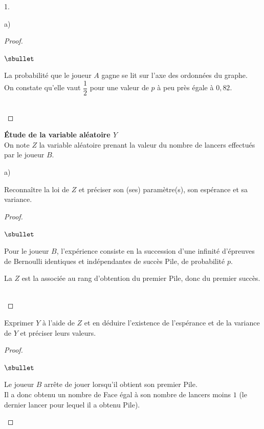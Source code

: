 \begin{noliste}{1.}
\begin{noliste}{a)}
\begin{proof}
\begin{noliste}{$\sbullet$}
      \item La probabilité que le joueur $A$ gagne se lit sur l'axe 
      des ordonnées du graphe.\\
      On constate qu'elle vaut $\dfrac{1}{2}$ pour une valeur de $p$
      à peu près égale à $0,82$.
     \end{noliste}
     ~\\[-1cm]
    \end{proof}
  \end{noliste}
  
  \item {\bf Étude de la variable aléatoire $Y$}\\[.1cm]
  On note $Z$ la variable aléatoire prenant la valeur du nombre de 
  lancers effectués par le joueur $B$.
  \begin{noliste}{a)}
    \setlength{\itemsep}{2mm}
    \item Reconnaître la loi de $Z$ et préciser son (ses) paramètre(s), 
    son espérance et sa variance.
    
    \begin{proof}~
      \begin{noliste}{$\sbullet$}
	\item Pour le joueur $B$, l'expérience consiste en la 
	succession d'une infinité d'épreuves de Bernoulli 
	identiques et indépendantes de succès Pile, de probabilité $p$.
	
	\item La \var $Z$ est la \var associée au rang d'obtention 
	du premier Pile, donc du premier succès.
      \end{noliste}
      ~\\[-1cm]
    \end{proof}

    
    \item Exprimer $Y$ à l'aide de $Z$ et en déduire l'existence de 
    l'espérance et de la variance de $Y$ et préciser leurs valeurs.
    
    \begin{proof}~
     \begin{noliste}{$\sbullet$}
      \item Le joueur $B$ arrête de jouer lorsqu'il obtient son premier 
      Pile.\\
      Il a donc obtenu un nombre de Face égal à son nombre de lancers 
      moins $1$ (le dernier lancer pour lequel il a obtenu Pile).
      

\end{noliste}
\end{proof}
\end{noliste}
\end{noliste}
